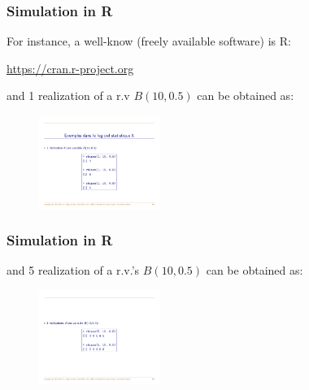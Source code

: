 \documentclass[notes=show,smaller,handout]{beamer}\usepackage[]{graphicx}\usepackage[]{color}
\begin{document}
\begin{frame}
\frametitle{Simulation in R}

For instance, a well-know (freely available software) is R:

\begin{center}
\url{https://cran.r-project.org}
\end{center}


\medskip

and 1 realization of a r.v  $B(10, 0.5)$ can be obtained as:

\medskip

\begin{center} %
\begin{figure}[ptb]\centering
\includegraphics[width=0.35\textwidth,height=0.35\textheight]{img/sim1.pdf}
\end{figure}

\end{center}
\end{frame}



\begin{frame}
\frametitle{Simulation in R}


and 5 realization of a r.v.'s  $B(10, 0.5)$ can be obtained as:

\medskip

\begin{center} %
\begin{figure}[ptb]\centering
\includegraphics[width=0.35\textwidth,height=0.3\textheight]{img/sim2.pdf}
\end{figure}

\end{center}
\end{frame}
\end{document}
